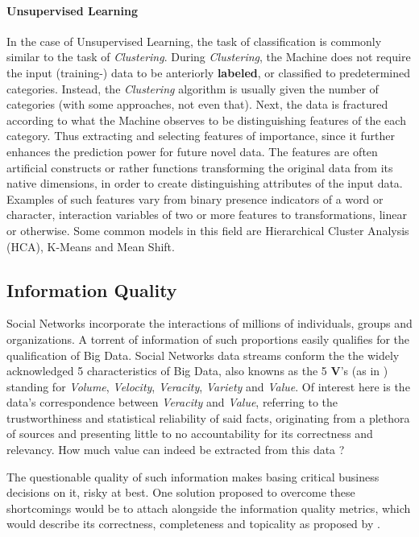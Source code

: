 		\paragraph{Unsupervised Learning}
			In the case of Unsupervised Learning, the task of classification is commonly similar to the task of \textit{Clustering}. During \textit{Clustering}, the Machine does not require the input (training-) data to be anteriorly \textbf{labeled}, or classified to predetermined categories. Instead, the \textit{Clustering} algorithm is usually given the number of categories (with some approaches, not even that). Next, the data is fractured according to what the Machine observes to be distinguishing features of the each category. Thus extracting and selecting features of importance, since it further enhances the prediction power for future novel data. The features are often artificial constructs or rather functions transforming the original data from its native dimensions, in order to create distinguishing attributes of the input data. Examples of such features vary from binary presence indicators of a word or character, interaction variables of two or more features to transformations, linear or otherwise. Some common models in this field are Hierarchical Cluster Analysis (HCA), K-Means and Mean Shift.
		
	\subsection{Information Quality}
		Social Networks incorporate the interactions of millions of individuals, groups and organizations. A torrent of information of such proportions easily qualifies for the qualification of Big Data. Social Networks data streams conform the the widely acknowledged 5 characteristics of Big Data, also knowns as the 5 \textbf{V}'s (as in \cite{bigdata}) standing for \textit{Volume}, \textit{Velocity}, \textit{Veracity}, \textit{Variety} and \textit{Value}. Of interest here is the data's correspondence between \textit{Veracity} and \textit{Value}, referring to the trustworthiness and statistical reliability of said facts, originating from a plethora of sources and presenting little to no accountability for its correctness and relevancy. How much value can indeed be extracted from this data ?
		
		\par
		
		The questionable quality of such information makes basing critical business decisions on it, risky at best. One solution proposed to overcome these shortcomings would be to attach alongside the information quality metrics, which would describe its correctness, completeness and topicality as proposed by \cite{klier2016datenqualitat}.